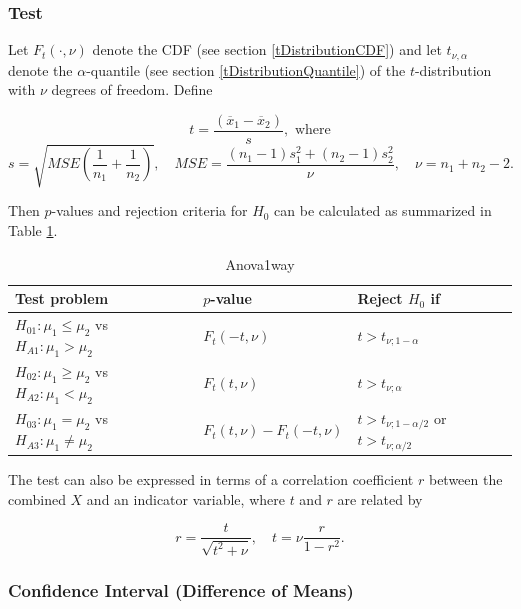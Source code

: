 \subsubsection{Test}
\label{Anova1way_Test}
Let $F_t\left(\cdot, \nu\right)$ denote the CDF (see section \ref{tDistributionCDF}) and let $t_{\nu,\alpha}$ denote the $\alpha$-quantile (see section \ref{tDistributionQuantile}) of the $t$-distribution with $\nu$ degrees of freedom. Define

\begin{equation}
	t= \frac{(\overline{x}_1-\overline{x}_2)}{s}, \text{ where}
\end{equation}
\begin{equation} \label{eq:Anova1way}
	s = \sqrt{\textit{MSE}\left(\frac{1}{n_1}+\frac{1}{n_2}\right)}, \quad \textit{MSE} = \frac{(n_1-1)s_1^2+(n_2-1)s_2^2}{\nu}, \quad \nu=n_1+n_2-2.
\end{equation}

Then $p$-values and rejection criteria for $H_0$ can be calculated as summarized in Table \ref{TableAnova1way}.

\begin{table}[ht]
	\centering
	\begin{tabular}{|l|l|l|}
		\hline
		Test problem & $p$-value & Reject $H_0$ if \\
		\hline
		$H_{01}: \mu_1 \leq \mu_2$ vs $H_{A1}: \mu_1 > \mu_2$ & $F_t\left(-t, \nu\right)$ &$t > t_{\nu;1-\alpha}$ \\
		$H_{02}: \mu_1 \geq \mu_2$ vs $H_{A2}: \mu_1 < \mu_2$ & $F_t\left(t, \nu\right)$  &$t > t_{\nu;\alpha}$ \\
		$H_{03}: \mu_1 = \mu_2$ vs $H_{A3}: \mu_1 \neq \mu_2$ & $F_t\left(t, \nu\right)-F_t\left(-t, \nu\right)$ &$t > t_{\nu;1-\alpha/2}$ or $t > t_{\nu;\alpha/2}$ \\
		\hline
	\end{tabular}
	\caption{Anova1way}
	\label{TableAnova1way}
\end{table}


The test can also be expressed in terms of a correlation coefficient $r$ between the combined $X$ and an indicator variable, where $t$ and $r$ are related by

\begin{equation}
	r=\frac{t}{\sqrt{t^2+\nu}}, \quad t= \nu \frac{r}{1-r^2}.
\end{equation}



\subsubsection{Confidence Interval (Difference of Means)}
\label{Anova1way_CI}

